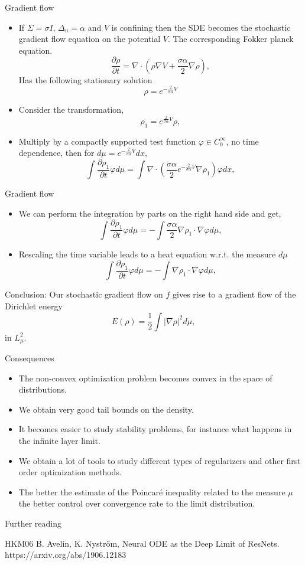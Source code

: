 \documentclass[10pt]{beamer}
\renewcommand{\phi}{\varphi}
\begin{document}
\begin{frame}[t]{Gradient flow}
\begin{itemize}
	\item If $\Sigma = \sigma I$, $\Delta_n = \alpha$ and $V$ is confining then the SDE becomes the stochastic gradient flow equation on the potential $V$. The corresponding Fokker planck equation.
	$$
	    \frac{\partial \rho}{\partial t} = \nabla \cdot \left (\rho \nabla V + \frac{\sigma \alpha}{2}\nabla \rho \right ),
	$$
	Has the following stationary solution $$\rho = e^{-\frac{2}{\sigma \alpha} V}$$
	\pause
	\item Consider the transformation,
	$$\rho_1 = e^{\frac{2}{\sigma \alpha} V } \rho,$$ 
	\item Multiply by a compactly supported test function $\phi \in C_0^\infty$, no time dependence, then for $d \mu = e^{-\frac{2}{\sigma \alpha} V} dx$,
	$$
	    \int \frac{\partial \rho_1}{\partial t} \phi d \mu = \int \nabla \cdot \left ( \frac{\sigma \alpha}{2} e^{-\frac{2}{\sigma \alpha} V } \nabla \rho_1 \right ) \phi dx,
	$$
\end{itemize}
\end{frame}
\begin{frame}[t]{Gradient flow}
	\begin{itemize}
		\item We can perform the integration by parts on the right hand side and get,
		$$
		    \int \frac{\partial \rho_1}{\partial t} \phi d \mu = - \int \frac{\sigma \alpha}{2} \nabla \rho_1 \cdot \nabla \phi d \mu,
		$$
		\item Rescaling the time variable leads to a heat equation w.r.t. the measure $d \mu$
		$$
		    \int \frac{\partial \rho_1}{\partial t} \phi d \mu = - \int \nabla \rho_1 \cdot \nabla \phi d \mu,
		$$
	\end{itemize}
	Conclusion:
	Our stochastic gradient flow on $f$ gives rise to a gradient flow of the Dirichlet energy
	$$
	    E(\rho) = \frac{1}{2} \int |\nabla \rho|^2 d\mu,
	$$
	in $L^2_\mu$.
\end{frame}
\begin{frame}[t]{Consequences}
	\begin{itemize}
		\item The non-convex optimization problem becomes convex in the space of distributions.
		\item We obtain very good tail bounds on the density.
		\item It becomes easier to study stability problems, for instance what happens in the infinite layer limit.
		\item We obtain a lot of tools to study different types of regularizers and other first order optimization methods.
		\item The better the estimate of the Poincaré inequality related to the measure $\mu$ the better control over convergence rate to the limit distribution.
	\end{itemize}
\end{frame}

\begin{frame}{Further reading} %
	\begin{thebibliography}{HKM06}
		\footnotesize
		 B. Avelin, K. Nyström,
		\newblock Neural ODE as the Deep Limit of ResNets. https://arxiv.org/abs/1906.12183
	\end{thebibliography}
\end{frame}
\end{document}
